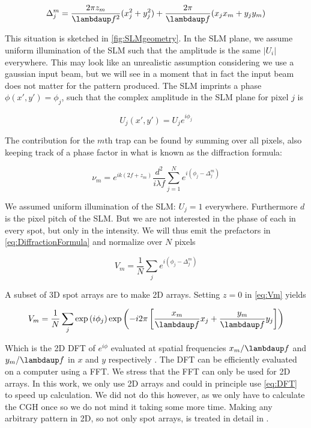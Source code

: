 \begin{equation}\label{eq:PropagationPhase}
    \Delta_j^m = \frac{2\pi z_m}{\lambdaup f^2}(x_j^2+y_j^2)+\frac{2\pi}{\lambdaup f}(x_j x_m +y_j y_m)
\end{equation}

This situation is sketched in \cref{fig:SLMgeometry}.
In the SLM plane, we assume uniform illumination of the SLM such that the amplitude is the same $|U_i|$ everywhere.
This may look like an unrealistic assumption considering we use a gaussian input beam, but we will see in a moment that in fact the input beam does not matter for the pattern produced. 
The SLM imprints a phase $\phi(x',y') = \phi_j$, such that the complex amplitude in the SLM plane for pixel $j$ is

\begin{equation}
    U_j(x',y') = U_j e^{i \phi_j}
\end{equation}

The contribution for the $m$th trap can be found by summing over all pixels, also keeping track of a phase factor in what is known as the diffraction formula:

\begin{equation}\label{eq:DiffractionFormula}
    \nu_m = e^{i k \left(2 f + z_m\right)}
    \frac{d^2}{i \lambda f} \sum_{j=1}^N e^{i(\phi_j - \Delta_j^m)}
\end{equation}

We assumed uniform illumination of the \ac{SLM}: $U_j =1$ everywhere. 
Furthermore $d$ is the pixel pitch of the SLM. 
But we are not interested in the phase of each in every spot, but only in the intensity. 
We will thus emit the prefactors in \cref{eq:DiffractionFormula} and normalize over $N$ pixels

\begin{equation}\label{eq:Vm}
    V_m = \frac{1}{N} \sum_{j} e^{i(\phi_j - \Delta_j^m)}
\end{equation}

A subset of 3D spot arrays are to make 2D arrays. 
Setting $z=0$ in \cref{eq:Vm} yields 

\begin{equation}\label{eq:2Dcase}
    V_m = \frac{1}{N} \sum_j \exp{\left(i\phi_j\right)} \exp{\left(
    - i 2\pi \left[
    \frac{x_m}{\lambdaup f} x_j + \frac{y_m}{\lambdaup f} y_j
    \right]
    \right)}
\end{equation}

Which is the 2D \ac{DFT} of $e^{i\phi}$ evaluated at spatial frequencies $x_m/\lambdaup f$ and $y_m/\lambdaup f$ in $x$ and $y$ respectively \cite{DiLeonardo2007,Bijnen2015}. 
The DFT can be efficiently evaluated on a computer using a \ac{FFT}. We stress that the FFT can only be used for 2D arrays. 
In this work, we only use 2D arrays and could in principle use \cref{eq:DFT} to speed up calculation. 
We did not do this however, as we only have to calculate the \ac{CGH} once so we do not mind it taking some more time.
Making any arbitrary pattern in 2D, so not only spot arrays, is treated in detail in \cite{Bijnen2013}.  

